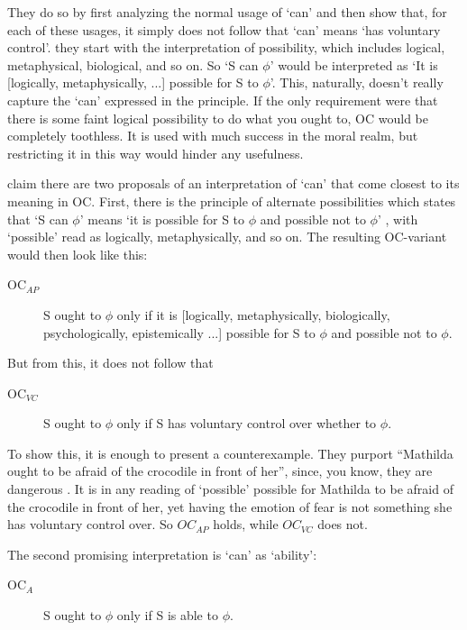 \documentclass[12pt,numbers=noenddot]{scrartcl}
\begin{document}
They do so by first analyzing the normal usage of ‘can’ and then show that, for each of these usages, it simply does not follow that ‘can’ means ‘has voluntary control’. they start with the interpretation of possibility, which includes logical, metaphysical, biological, and so on. So ‘S can $\phi$’ would be interpreted as ‘It is [logically, metaphysically, ...] possible for S to $\phi$’. This, naturally, doesn't really capture the ‘can’ expressed in the principle. If the only requirement were that there is some faint logical possibility to do what you ought to, OC would be completely toothless. It is used with much success in the moral realm, but restricting it in this way would hinder any usefulness.

 \textcite[616]{Chuard2009-CHUENW} claim there are two proposals of an interpretation of ‘can’ that come closest to its meaning in OC. First, there is the principle of alternate possibilities which states that ‘S can $\phi$’ means ‘it is possible for S to $\phi$ and possible not to $\phi$’ \autocite[615]{Chuard2009-CHUENW}, with ‘possible’ read as logically, metaphysically, and so on. The resulting OC-variant would then look like this:

 \begin{description}
    \item[OC$_{AP}$] S ought to $\phi$ only if it is [logically, metaphysically, biologically, psychologically, epistemically ...] possible for S to $\phi$ and possible not to $\phi$.
 \end{description}

But from this, it does not follow that
\begin{description}
    \item[OC$_{VC}$] S ought to $\phi$ only if S has voluntary control over whether to $\phi$.
 \end{description}

 To show this, it is enough to present a counterexample. They purport “Mathilda ought to be afraid of the crocodile in front of her”, since, you know, they are dangerous \autocite[616]{Chuard2009-CHUENW}. It is in any reading of ‘possible’ possible for Mathilda to be afraid of the crocodile in front of her, yet having the emotion of fear is not something she has voluntary control over. So $OC_{AP}$ holds, while $OC_{VC}$ does not.

 The second promising interpretation is ‘can’ as ‘ability’:

 \begin{description}
    \item[OC$_{A}$] S ought to $\phi$ only if S is able to $\phi$.
 \end{description}
\end{document}
